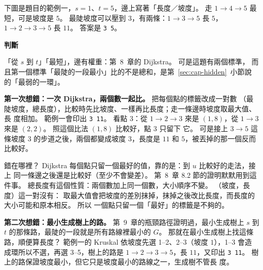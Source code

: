 下圖是題目的範例一，$s = 1$、$t = 5$，邊上寫著「長度／坡度」。 走 $1 \to 4 \to 5$
最短，可是坡度是 $5$。 最陡坡度可以壓到 $3$，有兩條：$1 \to 3 \to 5$ 長 $5$，
$1 \to 2 \to 3 \to 5$ 長 $11$。 答案是 \texttt{3 5}。

\begin{center}
\label{fig:cap-slope}
\end{center}

\textbf{判斷}

「從 $s$ 到 $t$」「最短」，邊有權重：第~8~章的 Dijkstra。 可是這題有兩個標準，
而且第一個標準「最陡的一段最小」比的不是總和，是第~\ref{sec:cap-hidden}~小節說
的「最弱的一環」。

\textbf{第一次想錯：一次 Dijkstra，兩個數一起比。} 把每個點的標籤改成一對數
（最陡坡度，總長度），比較時先比坡度、一樣再比長度；走一條邊時坡度取最大值、長
度相加。 範例一會印出 \texttt{3 11}。 看點 $3$：從 $1 \to 2 \to 3$ 來是
$(1, 8)$，從 $1 \to 3$ 來是 $(2, 2)$。 照這個比法 $(1, 8)$ 比較好，點 $3$ 只留下
它。 可是接上 $3 \to 5$ 這條坡度 $3$ 的步道之後，兩個都變成坡度 $3$，長度是
$11$ 和 $5$，被丟掉的那一個反而比較好。

錯在哪裡？ Dijkstra 每個點只留一個最好的值，靠的是：到 $u$ 比較好的走法，接上
同一條邊之後還是比較好（至少不會變差）。 第~8~章 8.2 節的證明默默用到這件事。
總長度有這個性質：兩個數加上同一個數，大小順序不變。 （坡度，長度）這一對沒有：
取最大值會把坡度的差別抹掉，抹掉之後改比長度，而長度的大小可能和原本相反。 所以
一個點只留一個「最好」的標籤是不夠的。

\textbf{第二次想錯：最小生成樹上的路。} 第~9~章的瓶頸路徑證明過，最小生成樹上 $s$
到 $t$ 的那條路，最陡的一段就是所有路線裡最小的 $G$。 那就在最小生成樹上找這條
路，順便算長度？ 範例一的 Kruskal 依坡度先選 1--2、2--3（坡度 $1$），1--3 會造
成環所以不選，再選 3--5，樹上的路是 $1 \to 2 \to 3 \to 5$，長 $11$，又印出
\texttt{3 11}。 樹上的路保證坡度最小，但它只是坡度最小的路線之一，生成樹不管長
度。

